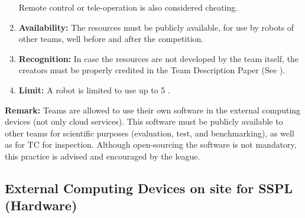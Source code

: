 \begin{enumerate}
	  Remote control or tele-operation is also considered cheating. 
	\item \textbf{Availability:} The resources must be publicly available, for use by robots of other teams, well before and after the competition.
	\item \textbf{Recognition:} In case the resources are not developed by the team itself, the creators must be properly credited in the Team Description Paper (See ).
	\item \textbf{Limit:} A robot is limited to use up to 5 . 
\end{enumerate}

\textbf{Remark:} Teams are allowed to use their own software in the external computing devices (not only cloud services). This software must be publicly available to other teams for scientific purposes (evaluation, test, and benchmarking), as well as for TC for inspection. Although open-sourcing the software is not mandatory, this practice is advised and encouraged by the league.

\subsection{External Computing Devices on site for SSPL (Hardware)}
\label{rule:robot_external_computing_devices_sspl}

